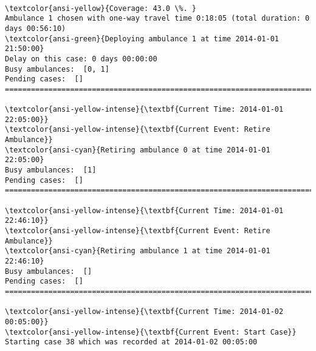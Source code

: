 \documentclass[11pt]{article}
\begin{document}
    \begin{center}
    \end{center}
    { \hspace*{\fill} \\}
    
    \begin{Verbatim}[commandchars=\\\{\}]
\textcolor{ansi-yellow}{Coverage: 43.0 \%. }
Ambulance 1 chosen with one-way travel time 0:18:05 (total duration: 0 days 00:56:10)
\textcolor{ansi-green}{Deploying ambulance 1 at time 2014-01-01 21:50:00}
Delay on this case: 0 days 00:00:00
Busy ambulances:  [0, 1]
Pending cases:  []
========================================================================

\textcolor{ansi-yellow-intense}{\textbf{Current Time: 2014-01-01 22:05:00}}
\textcolor{ansi-yellow-intense}{\textbf{Current Event: Retire Ambulance}}
\textcolor{ansi-cyan}{Retiring ambulance 0 at time 2014-01-01 22:05:00}
Busy ambulances:  [1]
Pending cases:  []
========================================================================

\textcolor{ansi-yellow-intense}{\textbf{Current Time: 2014-01-01 22:46:10}}
\textcolor{ansi-yellow-intense}{\textbf{Current Event: Retire Ambulance}}
\textcolor{ansi-cyan}{Retiring ambulance 1 at time 2014-01-01 22:46:10}
Busy ambulances:  []
Pending cases:  []
========================================================================

\textcolor{ansi-yellow-intense}{\textbf{Current Time: 2014-01-02 00:05:00}}
\textcolor{ansi-yellow-intense}{\textbf{Current Event: Start Case}}
Starting case 38 which was recorded at 2014-01-02 00:05:00

    \end{Verbatim}

    \begin{center}
    \end{center}
    { \hspace*{\fill} \\}
    
\end{document}
